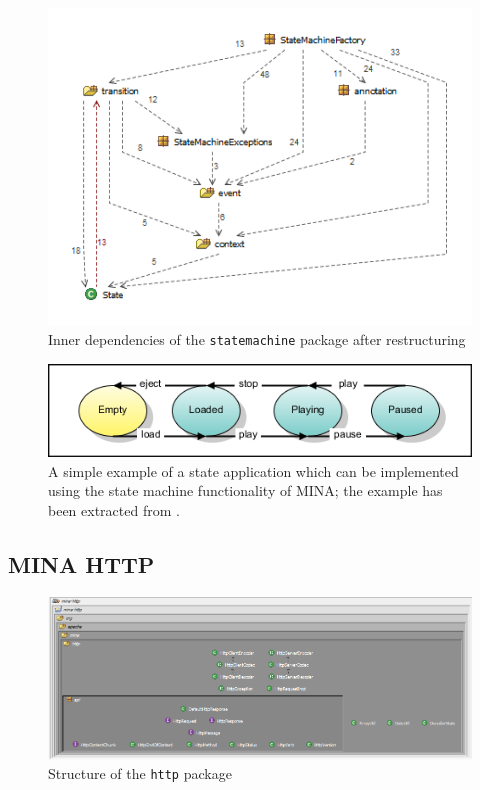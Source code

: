 \begin{figure}[H]
    \centering
    \includegraphics[scale = 0.8]{images/MINA_dependencies_statemachine_restructured.png}
    \caption{Inner dependencies of the \texttt{statemachine} package after restructuring}
    \label{fig:statemachine_restructured_dependencies}
\end{figure}

\begin{figure}[H]
    \centering
    \includegraphics[width=\textwidth]{images/state-diagram.png}
    \caption{A simple example of a state application which can be implemented using the state machine functionality of MINA; the example has been extracted from \cite{mina-userguide}.}
    \label{fig:statemachine_example}
\end{figure}

\subsection{MINA HTTP}

\begin{figure}[H]
    \centering
    \includegraphics[width=\textwidth]{images/MINA_http_structure_initial.png}
    \caption{Structure of the \texttt{http} package}
    \label{fig:http_structure_initial}
\end{figure}

